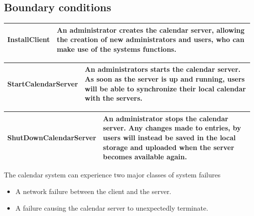 \subsection{Boundary conditions}

\begin{center}
    \begin{tabular}{ | l | p{10cm} |}
    \hline
    InstallClient & An administrator creates the calendar server, allowing the creation of new administrators and users, who can make use of the systems functions. \\ \hline
    \end{tabular}
\end{center}

\begin{center}
    \begin{tabular}{ | l | p{10cm} |}
    \hline
    StartCalendarServer & An administrators starts the calendar server. As soon as the server is up and running, users will be able to synchronize their local calendar with the servers. \\ \hline
    \end{tabular}
\end{center}

\begin{center}
    \begin{tabular}{ | l | p{10cm} |}
    \hline
    ShutDownCalendarServer & An administrator stops the calendar server. Any changes made to entries, by users will instead be saved in the local storage and uploaded when the server becomes available again. \\ \hline
    \end{tabular}
\end{center}


The calendar system can experience two major classes of system failures
\begin{itemize}
\item A network failure between the client and the server.
\item A failure causing the calendar server to unexpectedly terminate.
\end{itemize}

